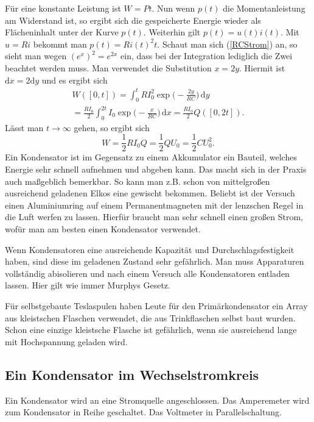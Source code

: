 \documentclass[a4paper,10pt,fleqn,twocolumn,twoside]{scrartcl}
\numberwithin{equation}{section}
\begin{document}
Für eine konstante Leistung ist $W=Pt$. Nun wenn $p(t)$ die
Momentanleistung am Widerstand ist, so ergibt sich die gespeicherte
Energie wieder als Flächeninhalt unter der Kurve $p(t)$.
Weiterhin gilt $p(t)=u(t)i(t)$. Mit $u=Ri$ bekommt man
$p(t)=Ri(t)^2 t$. Schaut man sich (\ref{RCStrom}) an, so sieht man
wegen $(e^x)^2=e^{2x}$ ein, dass bei der Integration lediglich
die Zwei beachtet werden muss. Man verwendet die Substitution
$x=2y$. Hiermit ist $\mathrm dx=2\mathrm dy$ und es ergibt sich%
\begin{gather*}
W([0,t]) = \int_0^t RI_0^2 \exp\Big(-\frac{2y}{RC}\Big)\,\mathrm dy\\
= \frac{RI_0}{2}\int_0^{2t} I_0 \exp\Big(-\frac{x}{RC}\Big)\,\mathrm dx
= \frac{RI_0}{2}Q([0,2t]).
\end{gather*}
Lässt man $t\rightarrow\infty$ gehen, so ergibt sich%
\begin{equation}
W = \frac{1}{2}RI_0Q = \frac{1}{2}QU_0 = \frac{1}{2}CU_0^2.
\end{equation}
Ein Kondensator ist im Gegensatz zu einem Akkumulator ein Bauteil,
welches Energie sehr schnell aufnehmen und abgeben kann. Das macht
sich in der Praxis auch maßgeblich bemerkbar. So kann man z.B. schon
von mittelgroßen ausreichend geladenen Elkos eine gewischt bekommen.
Beliebt ist der Versuch einen Aluminiumring auf einem
Permanentmagneten mit der lenzschen Regel in die Luft werfen zu
lassen. Hierfür braucht man sehr schnell einen großen Strom, wofür
man am besten einen Kondensator verwendet.

Wenn Kondensatoren eine ausreichende Kapazität und
Durchschlagsfestigkeit haben, sind diese im geladenen Zustand
sehr gefährlich. Man muss Apparaturen vollständig abisolieren
und nach einem Versuch alle Kondensatoren entladen lassen.
Hier gilt wie immer Murphys Gesetz.

Für selbstgebaute Teslaspulen haben Leute für den Primärkondensator
ein Array aus kleistschen Flaschen verwendet, die aus Trinkflaschen
selbst baut wurden. Schon eine einzige kleistsche Flasche ist
gefährlich, wenn sie ausreichend lange mit Hochspannung geladen wird.


\subsection[Ein Kondensator im Wechselstromkreis]%
{Ein Kondensator im Wechselstromkreis}

Ein Kondensator wird an eine Stromquelle angeschlossen.
Das Amperemeter wird zum Kondensator in Reihe geschaltet.
Das Voltmeter in Parallelschaltung.
\end{document}
